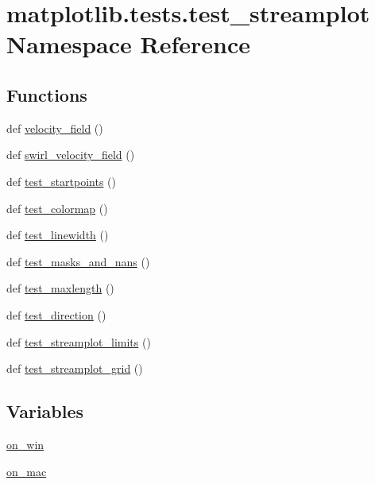 \hypertarget{namespacematplotlib_1_1tests_1_1test__streamplot}{}\section{matplotlib.\+tests.\+test\+\_\+streamplot Namespace Reference}
\label{namespacematplotlib_1_1tests_1_1test__streamplot}
\subsection*{Functions}
\begin{DoxyCompactItemize}
\item 
def \hyperlink{namespacematplotlib_1_1tests_1_1test__streamplot_a2d4a545ea49707b044fe73e78dd17d0a}{velocity\+\_\+field} ()
\item 
def \hyperlink{namespacematplotlib_1_1tests_1_1test__streamplot_a10311c79d0ee8d06b1544000767694fe}{swirl\+\_\+velocity\+\_\+field} ()
\item 
def \hyperlink{namespacematplotlib_1_1tests_1_1test__streamplot_a0cb9514aa083010ef92843fdd044ae49}{test\+\_\+startpoints} ()
\item 
def \hyperlink{namespacematplotlib_1_1tests_1_1test__streamplot_a65686197e61415bd42f4af4de37332f0}{test\+\_\+colormap} ()
\item 
def \hyperlink{namespacematplotlib_1_1tests_1_1test__streamplot_aa9ba24da0a3a8a6a526779e314e372f4}{test\+\_\+linewidth} ()
\item 
def \hyperlink{namespacematplotlib_1_1tests_1_1test__streamplot_a43295791bad446d57e9021fff49ff143}{test\+\_\+masks\+\_\+and\+\_\+nans} ()
\item 
def \hyperlink{namespacematplotlib_1_1tests_1_1test__streamplot_a6d7c59ed04d49f876acdd9059163eebb}{test\+\_\+maxlength} ()
\item 
def \hyperlink{namespacematplotlib_1_1tests_1_1test__streamplot_abd110df1c85a6988f74945df87d99a0e}{test\+\_\+direction} ()
\item 
def \hyperlink{namespacematplotlib_1_1tests_1_1test__streamplot_a134104f10383c103f2b093fb04b8ea9a}{test\+\_\+streamplot\+\_\+limits} ()
\item 
def \hyperlink{namespacematplotlib_1_1tests_1_1test__streamplot_afd1290764f8e619b5467ef31e1d9161c}{test\+\_\+streamplot\+\_\+grid} ()
\end{DoxyCompactItemize}
\subsection*{Variables}
\begin{DoxyCompactItemize}
\item 
\hyperlink{namespacematplotlib_1_1tests_1_1test__streamplot_a06e4f8e4fe2f81cd744a82757fe978c2}{on\+\_\+win}
\item 
\hyperlink{namespacematplotlib_1_1tests_1_1test__streamplot_a1be1b89703e3ffcf9fbd2a5c1f45c18a}{on\+\_\+mac}
\end{DoxyCompactItemize}


